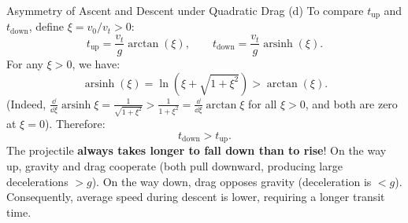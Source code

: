 \begin{workedexample}{Asymmetry of Ascent and Descent under Quadratic Drag}
(d) To compare $t_{\text{up}}$ and $t_{\text{down}}$, define $\xi = v_0/v_t > 0$:
\[
t_{\text{up}} = \frac{v_t}{g}\arctan(\xi), \qquad t_{\text{down}} = \frac{v_t}{g}\operatorname{arsinh}(\xi).
\]
For any $\xi > 0$, we have:
\[
\operatorname{arsinh}(\xi) = \ln\left(\xi + \sqrt{1+\xi^2}\right) > \arctan(\xi).
\]
(Indeed, $\frac{\dd}{\dd\xi}\operatorname{arsinh}\xi = \frac{1}{\sqrt{1+\xi^2}} > \frac{1}{1+\xi^2} = \frac{\dd}{\dd\xi}\arctan\xi$ for all $\xi > 0$, and both are zero at $\xi=0$).
Therefore:
\[
\boxed{t_{\text{down}} > t_{\text{up}}.}
\]
The projectile \textbf{always takes longer to fall down than to rise}!
On the way up, gravity and drag cooperate (both pull downward, producing large decelerations $> g$). On the way down, drag opposes gravity (deceleration is $< g$). Consequently, average speed during descent is lower, requiring a longer transit time.
\end{workedexample}
